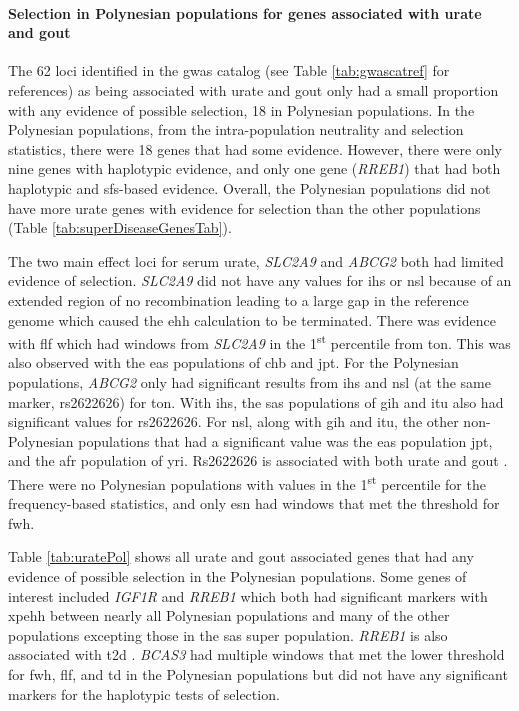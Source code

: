 \documentclass[]{report}
\let\oldparagraph\paragraph
\renewcommand{\paragraph}[1]{\oldparagraph{#1}\mbox{}}
\begin{document}
\FloatBarrier

\paragraph{Selection in Polynesian populations for genes associated with
urate and
gout}\label{selection-in-polynesian-populations-for-genes-associated-with-urate-and-gout}

The 62 loci identified in the \gls{gwas} catalog (see Table
\ref{tab:gwascatref} for references) as being associated with urate and
gout only had a small proportion with any evidence of possible
selection, 18 in Polynesian populations. In the Polynesian populations,
from the intra-population neutrality and selection statistics, there
were 18 genes that had some evidence. However, there were only nine
genes with haplotypic evidence, and only one gene (\emph{RREB1}) that
had both haplotypic and \gls{sfs}-based evidence. Overall, the
Polynesian populations did not have more urate genes with evidence for
selection than the other populations (Table
\ref{tab:superDiseaseGenesTab}).

The two main effect loci for serum urate, \emph{SLC2A9} and \emph{ABCG2}
both had limited evidence of selection. \emph{SLC2A9} did not have any
values for \gls{ihs} or \gls{nsl} because of an extended region of no
recombination leading to a large gap in the reference genome which
caused the \gls{ehh} calculation to be terminated. There was evidence
with \gls{flf} which had windows from \emph{SLC2A9} in the
1\textsuperscript{st} percentile from \gls{ton}. This was also observed
with the \gls{eas} populations of \gls{chb} and \gls{jpt}. For the
Polynesian populations, \emph{ABCG2} only had significant results from
\gls{ihs} and \gls{nsl} (at the same marker, rs2622626) for \gls{ton}.
With \gls{ihs}, the \gls{sas} populations of \gls{gih} and \gls{itu}
also had significant values for rs2622626. For \gls{nsl}, along with
\gls{gih} and \gls{itu}, the other non-Polynesian populations that had a
significant value was the \gls{eas} population \gls{jpt}, and the
\gls{afr} population of \gls{yri}. Rs2622626 is associated with both
urate and gout \citep{Kottgen2013}. There were no Polynesian populations
with values in the 1\textsuperscript{st} percentile for the
frequency-based statistics, and only \gls{esn} had windows that met the
threshold for \gls{fwh}.

Table \ref{tab:uratePol} shows all urate and gout associated genes that
had any evidence of possible selection in the Polynesian populations.
Some genes of interest included \emph{IGF1R} and \emph{RREB1} which both
had significant markers with \gls{xpehh} between nearly all Polynesian
populations and many of the other populations excepting those in the
\gls{sas} super population. \emph{RREB1} is also associated with
\gls{t2d} \citep{mahajan2014genome}. \emph{BCAS3} had multiple windows
that met the lower threshold for \gls{fwh}, \gls{flf}, and \gls{td} in
the Polynesian populations but did not have any significant markers for
the haplotypic tests of selection.
\end{document}
